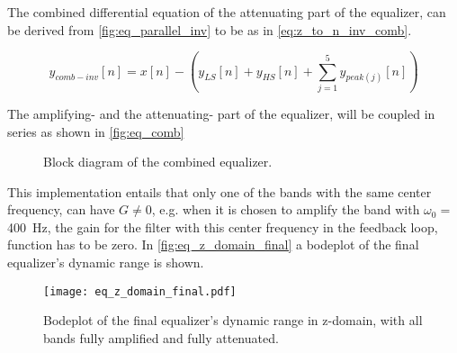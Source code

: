 The combined differential equation of the attenuating part of the equalizer, can be derived from \autoref{fig:eq_parallel_inv} to be as in \autoref{eq:z_to_n_inv_comb}.

\begin{equation}\label{eq:z_to_n_inv_comb}
        y_{comb-inv}[n] = x[n] - (y_{LS}[n] + y_{HS}[n] + \sum_{j=1}^{5} y_{peak(j)}[n])
    \end{equation}
    
The amplifying- and the attenuating- part of the equalizer, will be coupled in series as shown in \autoref{fig:eq_comb}

\begin{figure}[!h]
\centering
\def\svgwidth{0.72\columnwidth}
\scalebox{1}{}
\caption{Block diagram of the combined equalizer.}
		\label{fig:eq_comb}
\end{figure}

This implementation entails that only one of the bands with the same center frequency, can have $G \ne 0$, e.g. when it is chosen to amplify the band with $\omega_0 =$ \SI{400}{\hertz}, the gain for the filter with this center frequency in the feedback loop,  function has to be zero. 
In \autoref{fig:eq_z_domain_final} a bodeplot of the final equalizer's dynamic range is shown.

\begin{figure}[!h]
    \centering
        \texttt{[image: eq\_z\_domain\_final.pdf]}
        \caption{Bodeplot of the final equalizer's dynamic range in z-domain, with all bands fully amplified and fully attenuated.}
        \label{fig:eq_z_domain_final}
  \end{figure}


